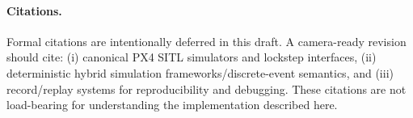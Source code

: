 \paragraph{Citations.}
Formal citations are intentionally deferred in this draft. A camera-ready revision should cite: (i) canonical PX4 SITL simulators and lockstep interfaces, (ii) deterministic hybrid simulation frameworks/discrete-event semantics, and (iii) record/replay systems for reproducibility and debugging. These citations are not load-bearing for understanding the implementation described here.
